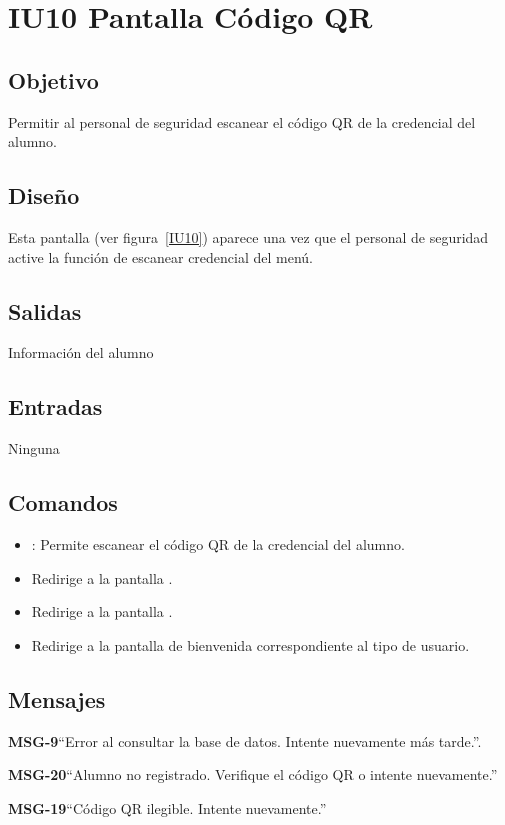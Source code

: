 \section{IU10 Pantalla Código QR}

\subsection{Objetivo}
Permitir al personal de seguridad escanear el código QR de la credencial del alumno.

\subsection{Diseño}
Esta pantalla  (ver figura~\ref{IU10}) aparece una vez que el personal de seguridad active la función de escanear credencial del menú. 


\subsection{Salidas}
Información del alumno

\subsection{Entradas}
Ninguna

\subsection{Comandos}
\begin{itemize}
	\item {}: Permite escanear el código QR de la credencial del alumno.
	\item {} Redirige a la pantalla .
    \item {} Redirige a la pantalla .
    \item {} Redirige a la pantalla de bienvenida correspondiente al tipo de usuario.
\end{itemize}

\subsection{Mensajes}

\begin{Citemize}
	\item {\bf MSG-9}{``Error al consultar la base de datos. Intente nuevamente más tarde.''}.
	\item {\bf MSG-20}{``Alumno no registrado. Verifique el código QR o intente nuevamente.''}
	\item {\bf MSG-19}{``Código QR ilegible. Intente nuevamente.''}
\end{Citemize}

